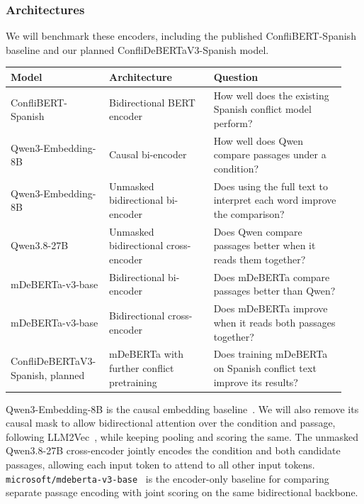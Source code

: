 \documentclass{article}
\begin{document}
\subsubsection{Architectures}
We will benchmark these encoders, including the published ConfliBERT-Spanish baseline and our planned ConfliDeBERTaV3-Spanish model.
\begin{center}
\small
\begin{tabular}{@{}>{\raggedright\arraybackslash}p{0.26\linewidth}>{\raggedright\arraybackslash}p{0.30\linewidth}>{\raggedright\arraybackslash}p{0.38\linewidth}@{}}
\toprule
\textbf{Model} & \textbf{Architecture} & \textbf{Question} \\
\midrule
ConfliBERT-Spanish~\cite{ConfliBERT-Spanish} & Bidirectional BERT encoder & How well does the existing Spanish conflict model perform? \\
Qwen3-Embedding-8B & Causal bi-encoder & How well does Qwen compare passages under a condition? \\
Qwen3-Embedding-8B & Unmasked bidirectional bi-encoder & Does using the full text to interpret each word improve the comparison? \\
Qwen3.8-27B & Unmasked bidirectional cross-encoder & Does Qwen compare passages better when it reads them together? \\
mDeBERTa-v3-base & Bidirectional bi-encoder & Does mDeBERTa compare passages better than Qwen? \\
mDeBERTa-v3-base & Bidirectional cross-encoder & Does mDeBERTa improve when it reads both passages together? \\
ConfliDeBERTaV3-Spanish, planned & mDeBERTa with further conflict pretraining & Does training mDeBERTa on Spanish conflict text improve its results? \\
\bottomrule
\end{tabular}
\end{center}

Qwen3-Embedding-8B is the causal embedding baseline~\cite{Qwen3-Embedding}. We will also remove its causal mask to allow bidirectional attention over the condition and passage, following LLM2Vec~\cite{LLM2Vec}, while keeping pooling and scoring the same. The unmasked Qwen3.8-27B cross-encoder jointly encodes the condition and both candidate passages, allowing each input token to attend to all other input tokens. \texttt{microsoft/mdeberta-v3-base}~\cite{DeBERTaV3} is the encoder-only baseline for comparing separate passage encoding with joint scoring on the same bidirectional backbone.
\end{document}

